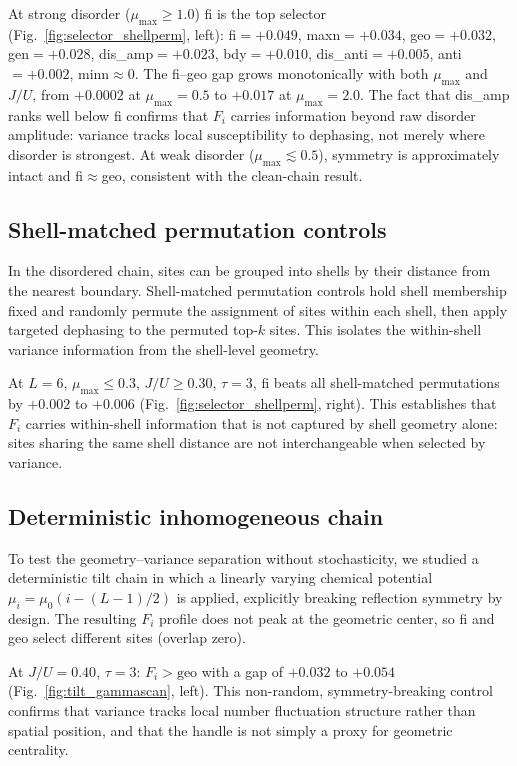 \documentclass[aps,prresearch,reprint,amsmath,amssymb,longbibliography,floatfix]{revtex4-2}
\newcommand{\Fi}{F_i}
\begin{document}
At strong disorder ($\mu_{\max}\geq1.0$) fi is the top selector
(Fig.~\ref{fig:selector_shellperm}, left):
fi$=+0.049$, maxn$=+0.034$, geo$=+0.032$, gen$=+0.028$,
dis\_amp$=+0.023$, bdy$=+0.010$, dis\_anti$=+0.005$, anti$=+0.002$,
minn$\approx0$.
The fi--geo gap grows monotonically with both $\mu_{\max}$ and $J/U$,
from $+0.0002$ at $\mu_{\max}=0.5$ to $+0.017$ at $\mu_{\max}=2.0$.
The fact that dis\_amp ranks well below fi confirms that $\Fi$ carries
information beyond raw disorder amplitude: variance tracks local
susceptibility to dephasing, not merely where disorder is strongest.
At weak disorder ($\mu_{\max}\lesssim0.5$), symmetry is approximately intact
and fi$\approx$geo, consistent with the clean-chain result.

\subsection{Shell-matched permutation controls}
\label{sec:shellperm}

In the disordered chain, sites can be grouped into shells by their
distance from the nearest boundary.
Shell-matched permutation controls hold shell membership fixed and randomly
permute the assignment of sites within each shell, then apply targeted
dephasing to the permuted top-$k$ sites.
This isolates the within-shell variance information from the shell-level
geometry.

At $L=6$, $\mu_{\max}\leq0.3$, $J/U\geq0.30$, $\tau=3$, fi beats all
shell-matched permutations by $+0.002$ to $+0.006$
(Fig.~\ref{fig:selector_shellperm}, right).
This establishes that $\Fi$ carries within-shell information that is not
captured by shell geometry alone: sites sharing the same shell distance
are not interchangeable when selected by variance.

\subsection{Deterministic inhomogeneous chain}
\label{sec:inhomogeneous}

To test the geometry--variance separation without stochasticity, we
studied a deterministic tilt chain in which a linearly varying chemical
potential $\mu_i = \mu_0(i - (L-1)/2)$ is applied, explicitly breaking
reflection symmetry by design.
The resulting $\Fi$ profile does not peak at the geometric center, so fi
and geo select different sites (overlap zero).

At $J/U=0.40$, $\tau=3$: $\Fi > \mathrm{geo}$ with a gap of $+0.032$ to $+0.054$
(Fig.~\ref{fig:tilt_gammascan}, left).
This non-random, symmetry-breaking control confirms that variance tracks
local number fluctuation structure rather than spatial position, and that
the handle is not simply a proxy for geometric centrality.
\end{document}
